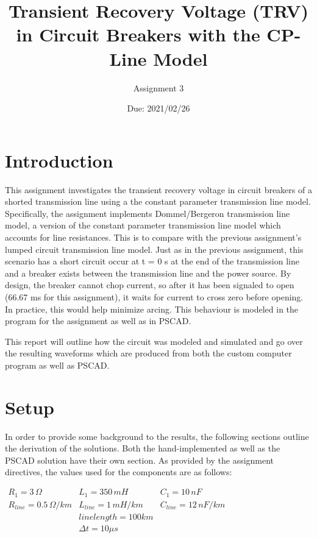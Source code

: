 \documentclass[10pt, oneside, letterpaper]{article}
\title{Transient Recovery Voltage (TRV) in Circuit Breakers with the CP-Line Model}
\author{Assignment 3}
\date{Due: 2021/02/26}
\begin{document}
\maketitle
\thispagestyle{fancy}

\section{Introduction}

This assignment investigates the transient recovery voltage in circuit breakers of a shorted transmission line using a the constant parameter transmission line model. Specifically, the assignment implements Dommel/Bergeron transmission line model, a version of the constant parameter transmission line model which accounts for line resistances. This is to compare with the previous assignment's lumped circuit transmission line model. Just as in the previous assignment, this scenario has a short circuit occur at t = 0 s at the end of the transmission line and a breaker exists between the transmission line and the power source. By design, the breaker cannot chop current, so after it has been signaled to open (66.67 ms for this assignment), it waits for current to cross zero before opening. In practice, this would help minimize arcing. This behaviour is modeled in the program for the assignment as well as in PSCAD.

This report will outline how the circuit was modeled and simulated and go over the resulting waveforms which are produced from both the custom computer program as well as PSCAD.

\section{Setup}

In order to provide some background to the results, the following sections outline the derivation of the solutions. Both the hand-implemented as well as the PSCAD solution have their own section. As provided by the assignment directives, the values used for the components are as follows:

\begin{center}
$\begin{array}{ccc}
    R_1 = 3\,\Omega & L_1 = 350\,mH & C_1 = 10\,nF \\
    R_{line} = 0.5\,\Omega/km & L_{line} = 1\,mH/km & C_{line} = 12\,nF/km \\
    &line length = 100 km \\
    &\Delta{}t = 10 \mu{}s
\end{array}$
\end{center}
\end{document}
